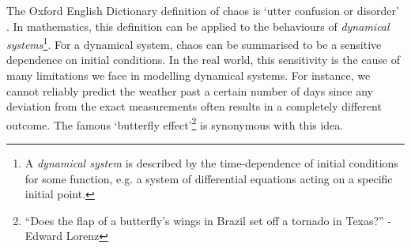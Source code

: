 The Oxford English Dictionary definition of chaos is `utter confusion or disorder' \cite{OED}. 
In mathematics, this definition can be applied to the behaviours of \textit{dynamical systems}\footnote{A \emph{dynamical system} is described by the time-dependence of initial conditions for some function, e.g. a system of differential equations acting on a specific initial point.}. 
For a dynamical system, chaos can be summarised to be a sensitive dependence on initial conditions.
In the real world, this sensitivity is the cause of many limitations we face in modelling dynamical systems. For instance, we cannot reliably predict the weather past a certain number of days since any deviation from the exact measurements often results in a completely different outcome. The famous `butterfly effect'\footnote{“Does the flap of a butterfly's wings in Brazil set off a tornado in Texas?” - Edward Lorenz} is synonymous with this idea.


